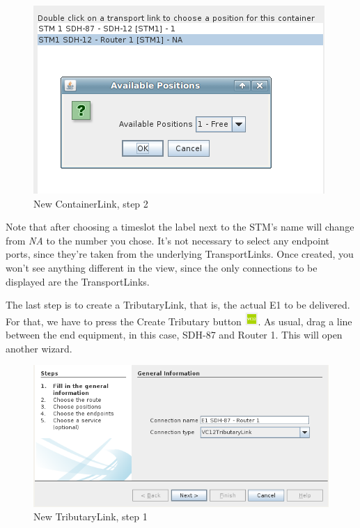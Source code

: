 \documentclass[a4paper]{article}
\begin{document}
		\begin{figure}[h!]
			\centering
			\includegraphics[width=0.7\linewidth]{img/sdh_module_container_link_step_3_2.png}
			\caption{New ContainerLink, step 2}
			\label{fig:sdh_module_container_link_step_3_2}
		\end{figure}
		
		Note that after choosing a timeslot the label next to the STM's name will change from \textit{NA} to the number you chose. It's not necessary to select any endpoint ports, since they're taken from the underlying TransportLinks. Once created, you won't see anything different in the view, since the only connections to be displayed are the TransportLinks.\newline
		
		The last step is to create a TributaryLink, that is, the actual E1 to be delivered. For that, we have to press the Create Tributary button \includegraphics[width=0.5cm]{img/sdh_module_tributary_link.png}. As usual, drag a line between the end equipment, in this case, SDH-87 and Router 1. This will open another wizard.
		\begin{figure}[h!]
			\centering
			\includegraphics[width=\linewidth]{img/sdh_module_tributary_link_step_1.png}
			\caption{New TributaryLink, step 1}
			\label{fig:sdh_module_tributary_link_step_1}
		\end{figure}
		
\end{document}

